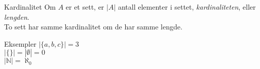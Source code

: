 \begin{frame}{Kardinalitet}
    Om $A$ er et sett, er $|A|$ antall elementer i settet, \textit{kardinaliteten}, eller \textit{lengden}.\\
    To sett har samme kardinalitet om de har samme lengde.
    \begin{block}{Eksempler}
        $|\{a, b, c\}| = 3$ \\
        $|\{\}| = |\emptyset| = 0$\\
        $|\mathbb{N}| = \aleph_0$
    \end{block}
\end{frame}